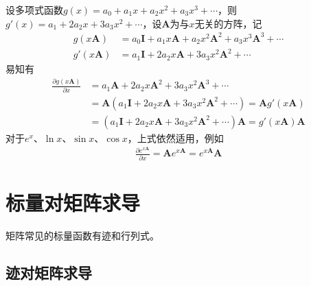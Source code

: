 \documentclass{ctexart}
\theoremstyle{definition}
\def \Av {\mathbf{A}}
\def \Iv {\mathbf{I}}
\begin{document}
设多项式函数$g(x) = a_0 + a_1 x + a_2 x^2 + a_3 x^3 + \cdots$，则$g'(x) = a_1 + 2 a_2 x + 3 a_3 x^2 + \cdots$，设$\Av$为与$x$无关的方阵，记
\begin{align*}
    g (x \Av)  & = a_0 \Iv + a_1 x \Av + a_2 x^2 \Av^2 + a_3 x^3 \Av^3 + \cdots \\
    g' (x \Av) & = a_1 \Iv + 2 a_2 x \Av + 3 a_3 x^2 \Av^2 + \cdots
\end{align*}
易知有
\begin{align*}
    \frac{\partial g(x \Av)}{\partial x} & = a_1 \Av + 2 a_2 x \Av^2 + 3 a_3 x^2 \Av^3 + \cdots                      \\
                                         & = \Av (a_1 \Iv + 2 a_2 x \Av + 3 a_3 x^2 \Av^2 + \cdots) = \Av g' (x \Av) \\
                                         & = (a_1 \Iv + 2 a_2 x \Av + 3 a_3 x^2 \Av^2 + \cdots) \Av = g' (x \Av) \Av
\end{align*}
对于$e^x$、$\ln x$、$\sin x$、$\cos x$，上式依然适用，例如
\begin{align*}
    \frac{\partial e^{x \Av}}{\partial x} = \Av e^{x \Av} = e^{x \Av} \Av
\end{align*}

\section{标量对矩阵求导}

矩阵常见的标量函数有迹和行列式。

\subsection{迹对矩阵求导}
\end{document}
